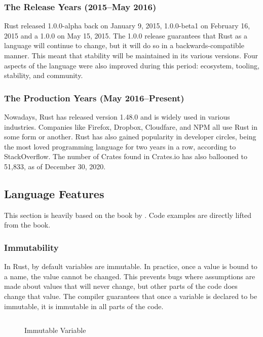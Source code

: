 \documentclass{article}
\newcommand{\rust}[1]{\inputminted{rust}{samples/rust/#1.rs}}
\begin{document}
  \subsubsection{The Release Years (2015--May 2016)}
  Rust released 1.0.0-alpha back on January 9, 2015, 1.0.0-beta1 on February 16,
  2015 and a 1.0.0 on May 15, 2015. The 1.0.0 release guarantees that Rust as a
  language will continue to change, but it will do so in a backwards-compatible
  manner. This meant that stability will be maintained in its various versions.
  Four aspects of the language were also improved during this period: ecosystem,
  tooling, stability, and community.

  \subsubsection{The Production Years (May 2016--Present)}
  Nowadays, Rust has released version 1.48.0 and is widely used in various
  industries. Companies like Firefox, Dropbox, Cloudfare, and NPM all use Rust
  in some form or another. Rust has also gained popularity in developer circles,
  being the most loved programming language for two years in a row, according to
  StackOverflow. The number of Crates found in Crates.io has also ballooned to
  51,833, as of December 30, 2020.

  \subsection{Language Features}

  This section is heavily based on the book  by
  \cite{klabnik_nichols_2018}. Code examples are directly lifted from the book.

  \subsubsection{Immutability}
  In Rust, by default variables are immutable. In practice, once a value is
  bound to a name, the value cannot be changed. This prevents bugs where
  assumptions are made about values that will never change, but other parts of
  the code does change that value. The compiler guarantees that once a variable
  is declared to be immutable, it is immutable in all parts of the code.

  \begin{figure}[ht]
    \rust{immutability}
    \caption{Immutable Variable}
    \label{fig:immut}
  \end{figure}
\end{document}
